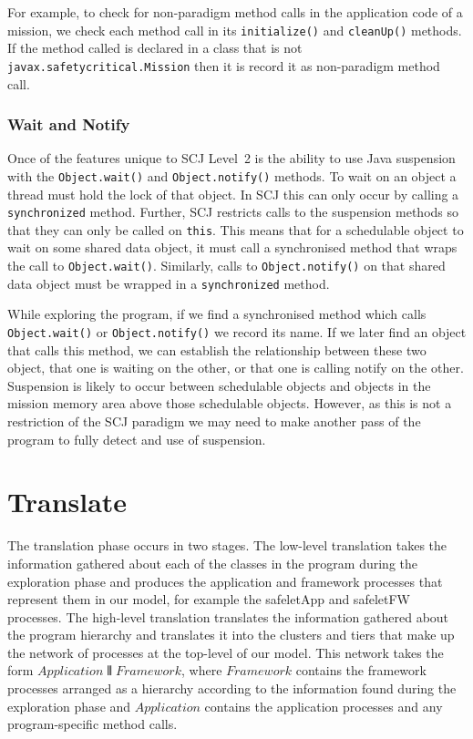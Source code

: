 \documentclass[10pt,a4paper]{article}
\begin{document}
For example, to check for non-paradigm method calls in the application code of a mission, we check each method call in its \texttt{initialize()} and \texttt{cleanUp()} methods. If the method called is declared in a class that is not \texttt{javax.safetycritical.Mission} then it is record it as non-paradigm method call. 


\subsubsection{Wait and Notify}

Once of the features unique to SCJ Level~2 is the ability to use Java suspension with the \texttt{Object.wait()} and \texttt{Object.notify()} methods. To wait on an object a thread must hold the lock of that object. In SCJ this can only occur by calling a \texttt{synchronized} method. Further, SCJ restricts calls to the suspension methods so that they can only be called on \texttt{this}. This means that for a schedulable object to wait on some shared data object, it must call a synchronised method that wraps the call to \texttt{Object.wait()}. Similarly, calls to \texttt{Object.notify()} on that shared data object must be wrapped in a \texttt{synchronized} method. 

While exploring the program, if we find a synchronised method which calls \texttt{Object.wait()} or \texttt{Object.notify()} we record its name. If we later find an object that calls this method, we can establish the relationship between these two object, that one is waiting on the other, or that one is calling notify on the other. Suspension is likely to occur between schedulable objects and objects in the mission memory area above those schedulable objects. However, as this is not a restriction of the SCJ paradigm we may need to make another pass of the program to fully detect and use of suspension.


\section{Translate}
\label{sec:translation}

The translation phase occurs in two stages. The low-level translation takes the information gathered about each of the classes in the program during the exploration phase and produces the application and framework processes that represent them in our model, for example the safeletApp and safeletFW processes. The high-level translation translates the information gathered about the program hierarchy and translates it into the clusters and tiers that make up the network of processes at the top-level of our model. This network takes the form $Application \interleave Framework$, where $Framework$ contains the framework processes arranged as a hierarchy according to the information found during the exploration phase and $Application$ contains the application processes and any program-specific method calls. 
\end{document}
